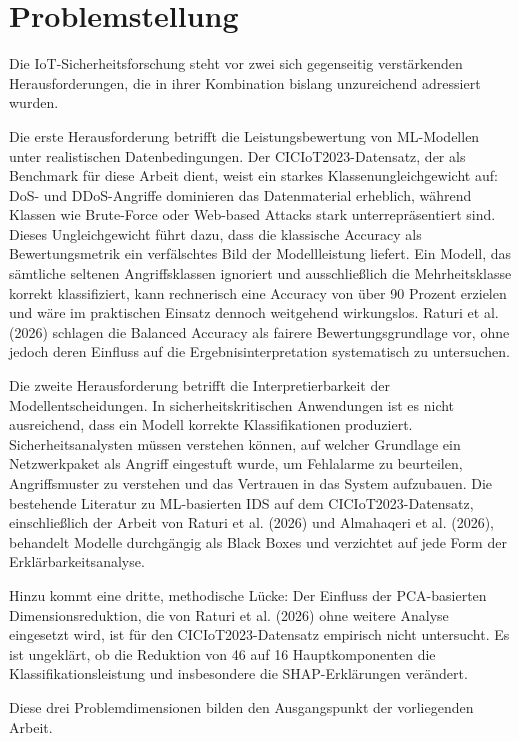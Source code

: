\section{Problemstellung}\label{problemstellung}

Die IoT-Sicherheitsforschung steht vor zwei sich gegenseitig verstärkenden Herausforderungen, die in ihrer Kombination bislang unzureichend adressiert wurden.

Die erste Herausforderung betrifft die Leistungsbewertung von ML-Modellen unter realistischen Datenbedingungen. Der CICIoT2023-Datensatz, der als Benchmark für diese Arbeit dient, weist ein starkes Klassenungleichgewicht auf: DoS- und DDoS-Angriffe dominieren das Datenmaterial erheblich, während Klassen wie Brute-Force oder Web-based Attacks stark unterrepräsentiert sind. Dieses Ungleichgewicht führt dazu, dass die klassische Accuracy als Bewertungsmetrik ein verfälschtes Bild der Modellleistung liefert. Ein Modell, das sämtliche seltenen Angriffsklassen ignoriert und ausschließlich die Mehrheitsklasse korrekt klassifiziert, kann rechnerisch eine Accuracy von über 90 Prozent erzielen und wäre im praktischen Einsatz dennoch weitgehend wirkungslos. Raturi et al. (2026) schlagen die Balanced Accuracy als fairere Bewertungsgrundlage vor, ohne jedoch deren Einfluss auf die Ergebnisinterpretation systematisch zu untersuchen.

Die zweite Herausforderung betrifft die Interpretierbarkeit der Modellentscheidungen. In sicherheitskritischen Anwendungen ist es nicht ausreichend, dass ein Modell korrekte Klassifikationen produziert. Sicherheitsanalysten müssen verstehen können, auf welcher Grundlage ein Netzwerkpaket als Angriff eingestuft wurde, um Fehlalarme zu beurteilen, Angriffsmuster zu verstehen und das Vertrauen in das System aufzubauen. Die bestehende Literatur zu ML-basierten IDS auf dem CICIoT2023-Datensatz, einschließlich der Arbeit von Raturi et al. (2026) und Almahaqeri et al. (2026), behandelt Modelle durchgängig als Black Boxes und verzichtet auf jede Form der Erklärbarkeitsanalyse.

Hinzu kommt eine dritte, methodische Lücke: Der Einfluss der PCA-basierten Dimensionsreduktion, die von Raturi et al. (2026) ohne weitere Analyse eingesetzt wird, ist für den CICIoT2023-Datensatz empirisch nicht untersucht. Es ist ungeklärt, ob die Reduktion von 46 auf 16 Hauptkomponenten die Klassifikationsleistung und insbesondere die SHAP-Erklärungen verändert.

Diese drei Problemdimensionen bilden den Ausgangspunkt der vorliegenden Arbeit.
